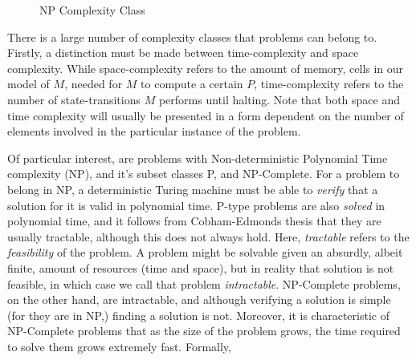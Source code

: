 \documentclass[11pt,letterpaper]{article}
\theoremstyle{definition}
\begin{document}
\begin{figure}
    \centering
    \caption{NP Complexity Class}
\end{figure}
There is a large number of complexity classes that problems can belong to. Firstly, a distinction must be made between time-complexity and space complexity. While space-complexity refers to the amount of memory, cells in our model of \(M\), needed for \(M\) to compute a certain \(P\), time-complexity refers to the number of state-transitions \(M\) performs until halting. Note that both space and time complexity will usually be presented in a form dependent on the number of elements involved in the particular instance of the problem.

Of particular interest, are problems with Non-deterministic Polynomial Time complexity (NP), and it's subset classes P, and NP-Complete. For a problem to belong in NP, a deterministic Turing machine must be able to \emph{verify} that a solution for it is valid in polynomial time. P-type problems are also \emph{solved} in polynomial time, and it follows from Cobham-Edmonds thesis that they are usually tractable\autocite{cobham_1965}, although this does not always hold\autocite{goldreich_2008}. Here, \emph{tractable} refers to the \emph{feasibility} of the problem. A problem might be solvable given an absurdly, albeit finite, amount of resources (time and space), but in reality that solution is not feasible, in which case we call that problem \emph{intractable}. NP-Complete problems, on the other hand, are intractable, and although verifying a solution is simple (for they are in NP,) finding a solution is not. Moreover, it is characteristic of NP-Complete problems that as the size of the problem grows, the time required to solve them grows extremely fast.\autocite{sep-computational-complexity} Formally,
\end{document}
